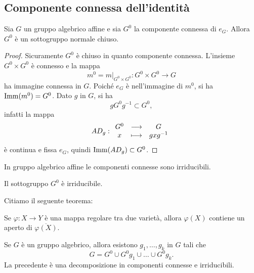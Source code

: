\subsection{Componente connessa dell'identit\`a}
\begin{proposition}
    Sia $G$ un gruppo algebrico affine e sia $G^0$ la componente connessa di $e_G$. Allora $G^0$ è un sottogruppo normale chiuso.
\end{proposition}
\begin{proof}
    Sicuramente $G^0$ è chiuso in quanto componente connessa. L'insieme $G^0\times G^0$ è connesso e la mappa \[ m^0=\left.m\right|_{G^0\times G^0}\colon G^0\times G^0 \longrightarrow G\] ha immagine connessa in $G$. Poiché $e_G$ è nell'immagine di $m^0$, si ha $\operatorname{Imm}(m^0)=G^0$. Dato $g$ in $G$, si ha \[gG^0g^{-1}\subset G^0,\]
    infatti la mappa
    \[AD_g:\begin{array}{ccc} {G^0} & \longrightarrow & {G}\\ {x} & \longmapsto & {gxg^{-1}} \end{array}\]
    \`e continua e fissa $e_G$, quindi $\operatorname{Imm}(AD_g)\subset G^0$.
\end{proof}
\begin{remark}\label{ReInGruppoComponentiConnesseSonoIrriducibili}
In gruppo algebrico affine le componenti connesse sono irriducibili.
\end{remark}

\begin{exercise}
    Il sottogruppo $G^0$ è irriducibile.
\end{exercise}

Citiamo il seguente teorema:

\begin{theorem}[Chevalley]\label{ThChevalley}
    Se $\varphi\colon X \to Y$ è una mappa regolare tra due varietà, allora $\varphi(X)$ contiene un aperto di $\overline{\varphi(X)}$.
\end{theorem}

\begin{remark}\label{RmDecomposizioneG0}
    Se $G$ è un gruppo algebrico, allora esistono $g_1,\ldots,g_k$ in $G$ tali che \[G=G^0 \cup G^0 g_1 \cup \ldots\cup G^0g_k.\]
    La precedente è una decomposizione in componenti connesse e irriducibili.
\end{remark}

